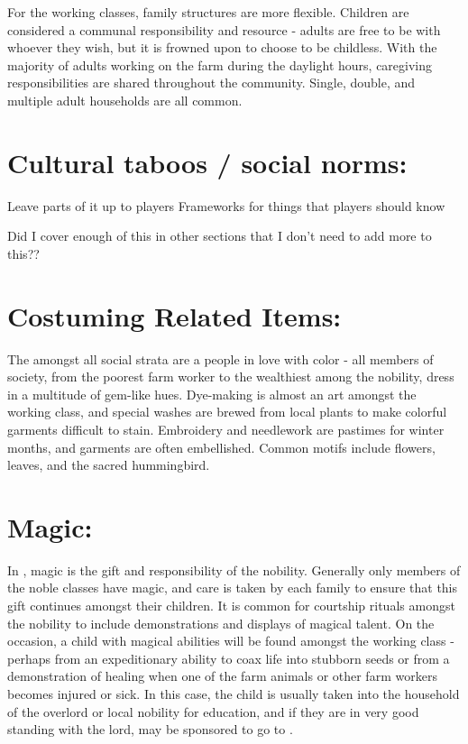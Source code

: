 \documentclass[blue]{GL2020}
\begin{document}
For the working classes, family structures are more flexible.  Children are considered a communal responsibility and resource - adults are free to be with whoever they wish, but it is frowned upon to choose to be childless.  With the majority of adults working on the farm during the daylight hours, caregiving responsibilities are shared throughout the community.  Single, double, and multiple adult households are all common.       

\section*{Cultural taboos / social norms:}

Leave parts of it up to players
Frameworks for things that players should know

Did I cover enough of this in other sections that I don't need to add more to this??

\section*{Costuming Related Items:}

The \pSunCh{} amongst all social strata are a people in love with color - all members of society, from the poorest farm worker to the wealthiest among the nobility, dress in a multitude of gem-like hues.  Dye-making is almost an art amongst the working class, and special washes are brewed from local plants to make colorful garments difficult to stain.  Embroidery and needlework are pastimes for winter months, and garments are often embellished.  Common motifs include flowers, leaves, and the sacred hummingbird.

\section*{Magic:}

In \pSun{}, magic is the gift and responsibility of the nobility. Generally only members of the noble classes have magic, and care is taken by each family to ensure that this gift continues amongst their children.  It is common for courtship rituals amongst the nobility to include demonstrations and displays of magical talent.  On the occasion, a child with magical abilities will be found amongst the working class - perhaps from an expeditionary ability to coax life into stubborn seeds or from a demonstration of healing when one of the farm animals or other farm workers becomes injured or sick.  In this case, the child is usually taken into the household of the overlord or local nobility for education, and if they are in very good standing with the lord, may be sponsored to go to \pSchool{}.
\end{document}
